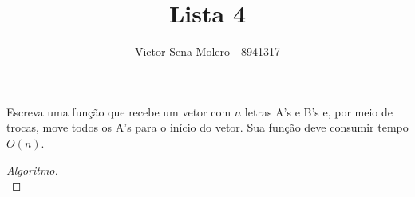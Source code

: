 \documentclass[12pt]{article}
\newenvironment{problem}[2][Ex]{\begin{trivlist}
\item[\hskip \labelsep {\bfseries #1}\hskip \labelsep {\bfseries #2.}]}{\end{trivlist}}
\begin{document}
 
 
\title{Lista 4}
\author{Victor Sena Molero - 8941317}
\maketitle
 
\begin{problem}{1.d}
Escreva uma função que recebe um vetor com $n$ letras A's e B's e, por meio de trocas, move todos os A's para o início do vetor. Sua função deve consumir tempo $O(n)$. \\
\end{problem}
 
\begin{proof}[Algoritmo]
\\
\end{proof}
\end{document}
